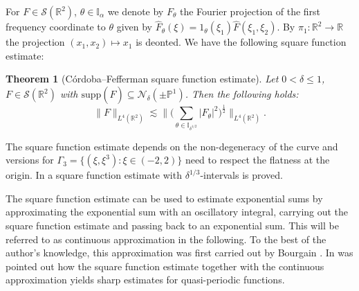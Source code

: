 \documentclass[10pt,a4paper]{amsart}
\newtheorem{theorem}{Theorem}[section]
\newcommand{\R}{\mathbb{R}}
\begin{document}
For $F \in \mathcal{S}(\R^2)$, $\theta \in \mathbb{I}_{\alpha}$ we denote by $F_{\theta}$ the Fourier projection  of the first frequency coordinate to $\theta$ given by $\hat{F}_{\theta}(\xi) = 1_{\theta}(\xi_1) \hat{F}(\xi_1,\xi_2)$. By $\pi_1 : \R^2 \to \R$ the projection $(x_1,x_2) \mapsto x_1$ is deonted. We have the following square function estimate:
\begin{theorem}[C\'ordoba--Fefferman square function estimate]
Let $0<\delta \leq 1$, $F \in \mathcal{S}(\R^2)$ with $\text{supp}(\hat{F}) \subseteq \mathcal{N}_{\delta}(\pm \mathbb{P}^1)$. Then the following holds:
\begin{equation*}
\| F \|_{L^4(\R^2)} \lesssim \big\| \big( \sum_{\theta \in \mathbb{I}_{\delta^{1/2}}} |F_{\theta}|^2 \big)^{\frac{1}{2}} \big\|_{L^4(\R^2)}.
\end{equation*}
\end{theorem}
The square function estimate depends on the non-degeneracy of the curve and versions for $\Gamma_3 = \{ (\xi,\xi^3) : \xi \in (-2,2) \}$ need to respect the flatness at the origin. In \cite[Theorem~2.2]{Schippa2025Quasiperiodic} a square function estimate with $\delta^{1/3}$-intervals is proved.

The square function estimate can be used to estimate exponential sums by approximating the exponential sum with an oscillatory integral, carrying out the square function estimate and passing back to an exponential sum. This will be referred to as continuous approximation in the following. To the best of the author's knowledge, this approximation was first carried out by Bourgain \cite{Bourgain2013}.
In \cite[Section~3.1]{Schippa2025Quasiperiodic} was pointed out how the square function estimate together with the continuous approximation yields sharp estimates for quasi-periodic functions. 

\smallskip
\end{document}
